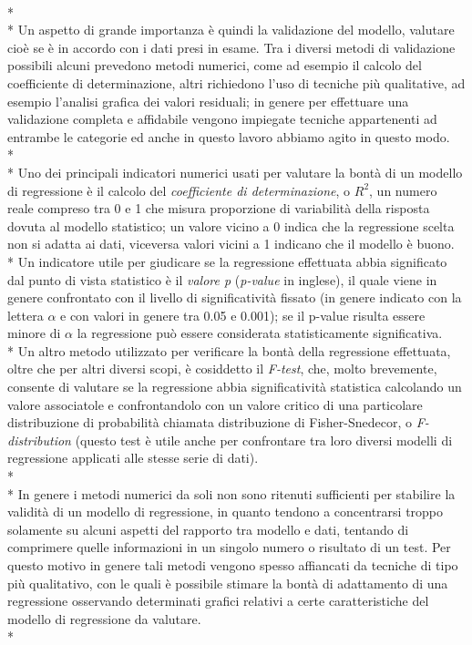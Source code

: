 \documentclass[12pt,a4paper,openright,twoside]{report}
\begin{document}
\\*\\*
Un aspetto di grande importanza è quindi la validazione del modello, valutare cioè se è in accordo con i dati presi in esame. Tra i diversi metodi di validazione possibili alcuni prevedono metodi numerici, come ad esempio il calcolo del coefficiente di determinazione, altri richiedono l'uso di tecniche più qualitative, ad esempio l'analisi grafica dei valori residuali; in genere per effettuare una validazione completa e affidabile vengono impiegate tecniche appartenenti ad entrambe le categorie ed anche in questo lavoro abbiamo agito in questo modo.\\*\\*
Uno dei principali indicatori numerici usati per valutare la bontà di un modello di regressione è il calcolo del \emph{coefficiente di determinazione}, o $R^2$, un numero reale compreso tra 0 e 1 che misura proporzione di variabilità della risposta dovuta al modello statistico; un valore vicino a 0 indica che la regressione scelta non si adatta ai dati, viceversa valori vicini a 1 indicano che il modello è buono. \\*
Un indicatore utile per giudicare se la regressione effettuata abbia significato dal punto di vista statistico è il  \emph{valore p} (\emph{p-value} in inglese), il quale viene in genere confrontato con il livello di significatività fissato (in genere indicato con la lettera $\alpha$ e con valori in genere tra 0.05 e 0.001); se il p-value risulta essere minore di $\alpha$ la regressione può essere considerata statisticamente significativa.\\*
Un altro metodo utilizzato per verificare la bontà della regressione effettuata, oltre che per altri diversi scopi, è cosiddetto il \emph{F-test}, che, molto brevemente, consente di valutare se la regressione abbia significatività statistica calcolando un valore associatole e confrontandolo con un valore critico di una particolare distribuzione di probabilità chiamata  distribuzione di Fisher-Snedecor, o \emph{F-distribution} (questo test è utile anche per confrontare tra loro diversi modelli di regressione applicati alle stesse serie di dati).\\*\\*
In genere i metodi numerici da soli non sono ritenuti sufficienti per stabilire la validità di un modello di regressione, in quanto tendono a concentrarsi troppo solamente su alcuni aspetti del rapporto tra modello e dati, tentando di comprimere quelle informazioni in un singolo numero o risultato di un test. Per questo motivo in genere  tali metodi vengono spesso affiancati da tecniche di tipo più qualitativo, con le quali è possibile stimare la bontà di adattamento di una regressione osservando determinati grafici relativi a certe caratteristiche del modello di regressione da valutare.\\*
\end{document}
